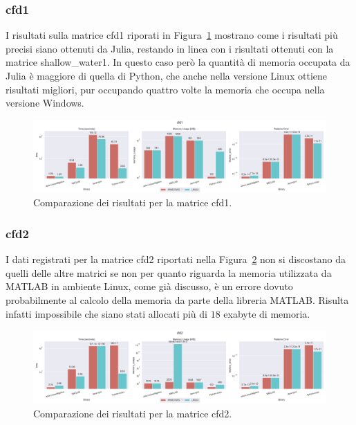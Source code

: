\documentclass[a4paper, 12pt]{article}
\begin{document}
\subsubsection{cfd1}
I risultati sulla matrice cfd1 riporati in Figura~\ref{fig:cfd1} mostrano come i
risultati più precisi siano ottenuti da Julia, restando in linea con i risultati
ottenuti con la matrice shallow\_water1. In questo caso però la quantità di
memoria occupata da Julia è maggiore di quella di Python, che anche nella
versione Linux ottiene risultati migliori, pur occupando quattro volte la
memoria che occupa nella versione Windows.
\begin{figure}[ht]
\includegraphics[width=\textwidth]{cfd1}
\caption{Comparazione dei risultati per la matrice cfd1.}
\label{fig:cfd1}
\end{figure}
\subsubsection{cfd2}
I dati registrati per la matrice cfd2 riportati nella Figura~\ref{fig:cfd2} non
si discostano da quelli delle altre matrici se non per quanto riguarda la
memoria utilizzata da MATLAB in ambiente Linux, come già discusso, è un errore
dovuto probabilmente al calcolo della memoria da parte della libreria MATLAB.
Risulta infatti impossibile che siano stati allocati più di $18$ exabyte di
memoria.
\begin{figure}[ht]
\includegraphics[width=\textwidth]{cfd2}
\caption{Comparazione dei risultati per la matrice cfd2.}
\label{fig:cfd2}
\end{figure}
\end{document}
